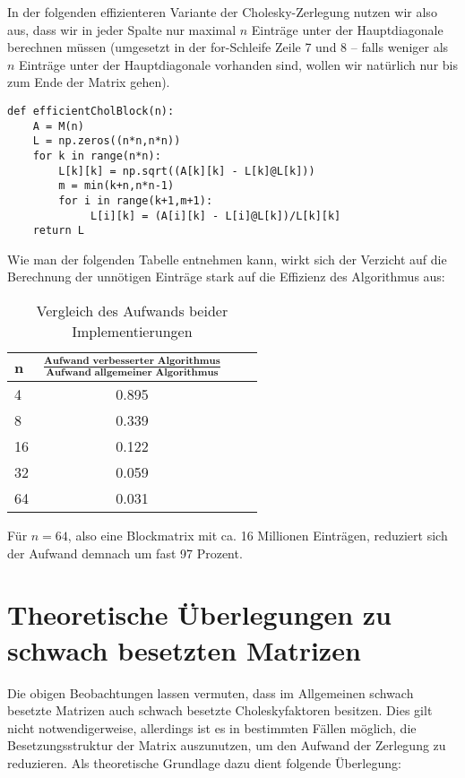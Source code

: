 In der folgenden effizienteren Variante der Cholesky-Zerlegung nutzen wir also aus, dass wir in jeder Spalte nur maximal $n$ Einträge unter der Hauptdiagonale berechnen müssen (umgesetzt in der for-Schleife Zeile 7 und 8 -- falls weniger als $n$ Einträge unter der Hauptdiagonale vorhanden sind, wollen wir natürlich nur bis zum Ende der Matrix gehen).

\lstset{language=Python}
\lstset{frame=lines}
\lstset{basicstyle=\footnotesize}
\begin{lstlisting}
def efficientCholBlock(n):
    A = M(n)
    L = np.zeros((n*n,n*n))
    for k in range(n*n):
        L[k][k] = np.sqrt((A[k][k] - L[k]@L[k]))
        m = min(k+n,n*n-1)
        for i in range(k+1,m+1):
             L[i][k] = (A[i][k] - L[i]@L[k])/L[k][k]
    return L
\end{lstlisting}

Wie man der folgenden Tabelle entnehmen kann, wirkt sich der Verzicht auf die Berechnung der unnötigen Einträge stark auf die Effizienz des Algorithmus aus:


\begin{table}[htb]
\centering
\caption{Vergleich des Aufwands beider Implementierungen}
\begin{tabular}{lccc}
\toprule
\textbf{n}
&\textbf{$\frac{\mathrm{\textbf{Aufwand verbesserter Algorithmus}}}{\mathrm{\textbf{Aufwand allgemeiner Algorithmus}}}$}  & \\
	        \midrule
4 & 0.895 \\
8 & 0.339 \\
16& 0.122 \\
32& 0.059 \\
64& 0.031 \\
\end{tabular}
\end{table}

Für $n=64$, also eine Blockmatrix mit ca. 16 Millionen Einträgen, reduziert sich der Aufwand demnach um fast 97 Prozent.

\section{Theoretische Überlegungen zu schwach besetzten Matrizen}

Die obigen Beobachtungen lassen vermuten, dass im Allgemeinen schwach besetzte Matrizen auch schwach besetzte Choleskyfaktoren besitzen. Dies gilt nicht notwendigerweise, allerdings ist es in bestimmten Fällen möglich, die Besetzungsstruktur der Matrix auszunutzen, um den Aufwand der Zerlegung zu reduzieren. Als theoretische Grundlage dazu dient folgende Überlegung:


